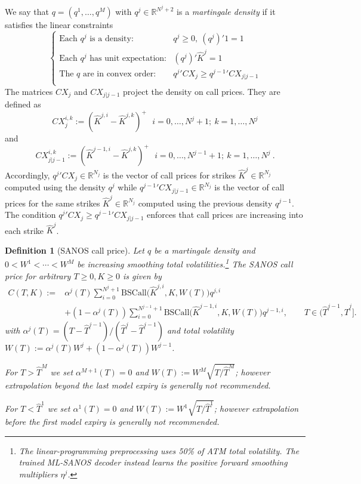 \documentclass[11pt,a4paper]{article}
\newtheorem{definition}{Definition}[section]
\newcommand{\R}{\mathbb{R}}
\newcommand{\BSCall}{\mathrm{BSCall}}
\begin{document}
We say that $q=(q^1,\ldots,q^M)$ with $q^j\in\R^{N^j+2}$ is a \emph{martingale density} if
it satisfies the linear constraints
\begin{equation}\label{eq:qocnd}
    \left\{
    \begin{array}{ll}
        \mbox{Each $q^j$ is a density:} & q^j\geq 0,\ (q^j)'1 = 1 \\
        \mbox{Each $q^j$ has unit expectation:} & (q^j)' \hat K^j=1 \\
        \mbox{The $q$ are in convex order:}&
            {q^j}' CX_j \geq {q^{j-1}}' CX_{j|j-1}
            \\
    \end{array}
    \right.
\end{equation}
The matrices $CX_j$ and $CX_{j|j-1}$ project the density on call prices. They are defined as
$$
CX_j^{i,k} := (\hat K^{j,i}-\hat K^{j,k})^+ \ \ \ i=0,\ldots,N^j+1;\ k=1,\ldots,N^j 
$$
and
$$
CX_{j|j-1}^{i,k} := (\hat K^{j-1,i}-\hat K^{j,k})^+ \ \ \ i=0,\ldots,N^{j-1}+1;\ k=1,\ldots,N^j  \ . 
$$
Accordingly, ${q^j}' CX_j \in \R^{N_j}$ is the vector of call prices for strikes $\hat K^{j}\in\R^{N_j}$ computed using the density $q^j$
while ${q^{j-1}}' CX_{j|j-1} \in \R^{N_j}$ is the vector of call prices for the same strikes $\hat K^{j}\in\R^{N_j}$ computed using the previous density $q^{j-1}$.
The condition ${q^j}' CX_j \geq {q^{j-1}}' CX_{j|j-1}$ enforces that call prices are increasing into each strike $\hat K^{j}$.

\begin{definition}[SANOS call price]
\label{def:sanos}
Let $q$ be a martingale density and $0<W^1< \cdots < W^M$
be increasing smoothing total volatilities.\footnote{The linear-programming preprocessing uses 50\% of ATM total volatility. The trained ML-SANOS decoder instead learns the positive forward smoothing multipliers $\eta^j$.}
The SANOS call price 
 for arbitrary $T\geq0 ,K\geq 0$ 
is given by
\begin{equation}
  \label{eq:sanos_interp}
  \begin{aligned}
  C(T,K):={}&\alpha^j(T)\sum_{i=0}^{N^j+1}
       \BSCall\!\bigl(\hat K^{j,i},K,W(T)\bigr)q^{j,i}\\
     &+(1-\alpha^j(T))\sum_{i=0}^{N^{j-1}+1}
       \BSCall\!\bigl(\hat K^{j-1,i},K,W(T)\bigr)q^{j-1,i},
       \qquad T \in (\hat T^{j-1},\hat T^j].
  \end{aligned}
\end{equation}
with $\alpha^j(T) = (T - \hat T^{j-1})/(\hat T^j - \hat T^{j-1})$
and total volatility $W(T) := \alpha^j(T) W^j + (1-\alpha^j(T)) W^{j-1}$.

For $T>\hat T^M$ we
set $\alpha^{M+1}(T)=0$ and $W(T):=W^M\sqrt{T / \hat T^M}$; however extrapolation beyond
the last model expiry is generally not recommended.

For $T<\hat T^1$ we
set $\alpha^1(T)=0$ and $W(T):=W^1\sqrt{T / \hat T^1}$; however extrapolation before
the first model expiry is generally not recommended.

\end{definition}
\end{document}
